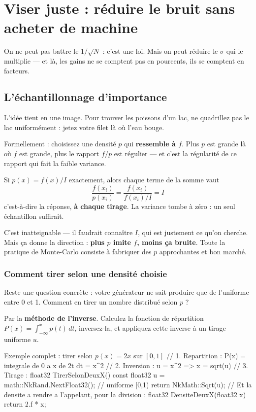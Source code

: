 \chapter{Viser juste : réduire le bruit sans acheter de machine}

On ne peut pas battre le $1/\sqrt{N}$ : c'est une loi. Mais on peut réduire le
$\sigma$ qui le multiplie — et là, les gains ne se comptent pas en pourcents,
ils se comptent en facteurs.

\section{L'échantillonnage d'importance}

L'idée tient en une image. Pour trouver les poissons d'un lac, ne quadrillez
pas le lac uniformément : jetez votre filet là où l'eau bouge.

Formellement : choisissez une densité $p$ qui \textbf{ressemble à $f$}. Plus
$p$ est grande là où $f$ est grande, plus le rapport $f/p$ est régulier — et
c'est la régularité de ce rapport qui fait la faible variance.

\begin{nkretenir}
Si $p(x) = f(x)/I$ exactement, alors chaque terme de la somme vaut
\[ \frac{f(x_i)}{p(x_i)} = \frac{f(x_i)}{f(x_i)/I} = I \]
c'est-à-dire la réponse, \textbf{à chaque tirage}. La variance tombe à zéro :
un seul échantillon suffirait.

C'est inatteignable — il faudrait connaître $I$, qui est justement ce qu'on
cherche. Mais ça donne la direction : \textbf{plus $p$ imite $f$, moins ça
bruite}. Toute la pratique de Monte-Carlo consiste à fabriquer des $p$
approchantes et bon marché.
\end{nkretenir}

\subsection{Comment tirer selon une densité choisie}

Reste une question concrète : votre générateur ne sait produire que de
l'uniforme entre 0 et 1. Comment en tirer un nombre distribué selon $p$ ?

Par la \textbf{méthode de l'inverse}. Calculez la fonction de répartition
$P(x) = \int_{-\infty}^{x} p(t)\,dt$, inversez-la, et appliquez cette inverse à
un tirage uniforme $u$.

\begin{nkcode}{Exemple complet : tirer selon $p(x) = 2x$ sur $[0,1]$}
// 1. Repartition :  P(x) = integrale de 0 a x de 2t dt = x^2
// 2. Inversion    :  u = x^2  =>  x = sqrt(u)
// 3. Tirage       :
float32 TirerSelonDeuxX() {
    const float32 u = math::NkRand.NextFloat32();   // uniforme [0,1)
    return NkMath::Sqrt(u);
}
// Et la densite a rendre a l'appelant, pour la division :
float32 DensiteDeuxX(float32 x) { return 2.f * x; }
\end{nkcode}

